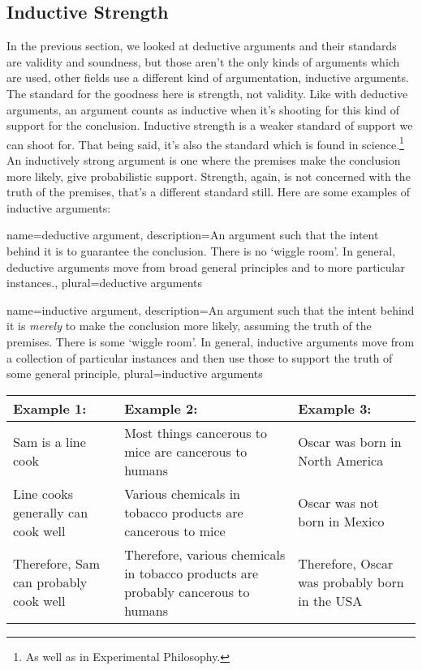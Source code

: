 \subsection{Inductive Strength}
\label{s:p1.2.2}

In the previous section, we looked at deductive arguments and their standards are validity and soundness, but those aren't the only kinds of arguments which are used, other fields use a different kind of argumentation, \glspl{inductive argument}. The standard for the goodness here is strength, not validity. Like with deductive arguments, an argument counts as inductive when it's shooting for this kind of support for the conclusion. Inductive strength is a weaker standard of support we can shoot for. That being said, it's also the standard which is found in science.\footnote{As well as in Experimental Philosophy.} An inductively strong argument is one where the premises make the conclusion more likely, give probabilistic support. Strength, again, is not concerned with the truth of the premises, that's a different standard still. Here are some examples of inductive arguments:

{
name=deductive argument,
description={An argument such that the intent behind it is to guarantee the conclusion. There is no ‘wiggle room'. In general, deductive arguments move from broad general principles and to more particular instances.},
plural=deductive arguments
}

{
name=inductive argument,
description={An argument such that the intent behind it is \emph{merely} to make the conclusion more likely, assuming the truth of the premises. There is some ‘wiggle room'. In general, inductive arguments move from a collection of particular instances and then use those to support the truth of some general principle},
plural=inductive arguments
}

\noindent
\begin{tabular}{p{2in}|p{2in}|p{2in}}
Example 1: &Example 2: &Example 3:\\\hline
Sam is a line cook &Most things cancerous to mice are cancerous to humans &Oscar was born in North America\\
Line cooks generally can cook well &Various chemicals in tobacco products are cancerous to mice &Oscar was not born in Mexico\\
Therefore, Sam can probably cook well &Therefore, various chemicals in tobacco products are probably cancerous to humans &Therefore, Oscar was probably born in the USA
\end{tabular}

